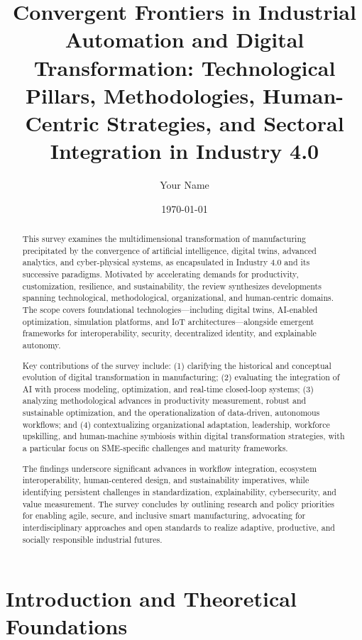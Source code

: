 \documentclass[11pt]{article}
\begin{document}
\author{Your Name}
\date{\today}

\title{\title{Convergent Frontiers in Industrial Automation and Digital Transformation: Technological Pillars, Methodologies, Human-Centric Strategies, and Sectoral Integration in Industry 4.0}}
\maketitle

\begin{abstract}
This survey examines the multidimensional transformation of manufacturing precipitated by the convergence of artificial intelligence, digital twins, advanced analytics, and cyber-physical systems, as encapsulated in Industry 4.0 and its successive paradigms. Motivated by accelerating demands for productivity, customization, resilience, and sustainability, the review synthesizes developments spanning technological, methodological, organizational, and human-centric domains. The scope covers foundational technologies—including digital twins, AI-enabled optimization, simulation platforms, and IoT architectures—alongside emergent frameworks for interoperability, security, decentralized identity, and explainable autonomy.

Key contributions of the survey include: (1) clarifying the historical and conceptual evolution of digital transformation in manufacturing; (2) evaluating the integration of AI with process modeling, optimization, and real-time closed-loop systems; (3) analyzing methodological advances in productivity measurement, robust and sustainable optimization, and the operationalization of data-driven, autonomous workflows; and (4) contextualizing organizational adaptation, leadership, workforce upskilling, and human-machine symbiosis within digital transformation strategies, with a particular focus on SME-specific challenges and maturity frameworks.

The findings underscore significant advances in workflow integration, ecosystem interoperability, human-centered design, and sustainability imperatives, while identifying persistent challenges in standardization, explainability, cybersecurity, and value measurement. The survey concludes by outlining research and policy priorities for enabling agile, secure, and inclusive smart manufacturing, advocating for interdisciplinary approaches and open standards to realize adaptive, productive, and socially responsible industrial futures.
\end{abstract}\section{Introduction and Theoretical Foundations}
\end{document}
